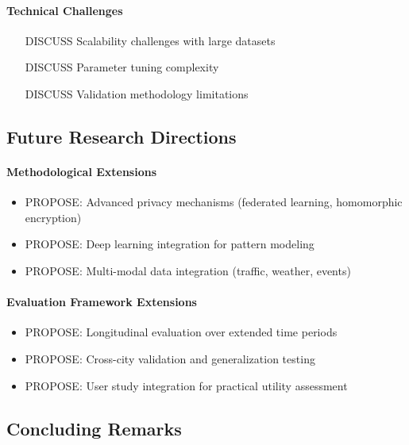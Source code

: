 \documentclass[runningheads]{llncs}
\begin{document}
\paragraph{Technical Challenges}
\begin{itemize}
\item [DISCUSS] Scalability challenges with large datasets
\item [DISCUSS] Parameter tuning complexity
\item [DISCUSS] Validation methodology limitations
\end{itemize}

\subsection{Future Research Directions}

\paragraph{Methodological Extensions}
\begin{itemize}
\item PROPOSE: Advanced privacy mechanisms (federated learning, homomorphic encryption)
\item PROPOSE: Deep learning integration for pattern modeling
\item PROPOSE: Multi-modal data integration (traffic, weather, events)
\end{itemize}

\paragraph{Evaluation Framework Extensions}
\begin{itemize}
\item PROPOSE: Longitudinal evaluation over extended time periods
\item PROPOSE: Cross-city validation and generalization testing
\item PROPOSE: User study integration for practical utility assessment
\end{itemize}

\subsection{Concluding Remarks}
\end{document}
